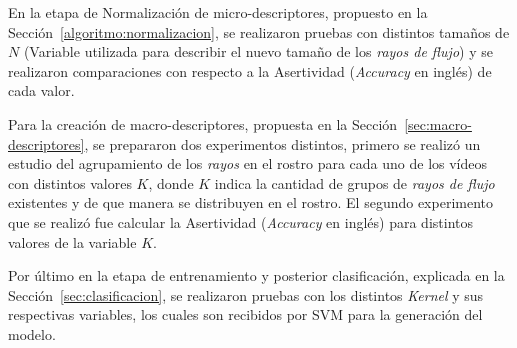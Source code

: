 En la etapa de Normalización de micro-descriptores, propuesto en la Sección~\ref{algoritmo:normalizacion}, se realizaron pruebas con distintos tamaños de $N$ (Variable utilizada para describir el nuevo tamaño de los \textit{rayos de flujo}) y se realizaron comparaciones con respecto a la Asertividad (\textit{Accuracy} en inglés) de cada valor.

Para la creación de macro-descriptores, propuesta en la Sección~\ref{sec:macro-descriptores}, se prepararon dos experimentos distintos, primero se realizó un estudio del agrupamiento de los \textit{rayos} en el rostro para cada uno de los vídeos con distintos valores $K$, donde $K$ indica la cantidad de grupos de \textit{rayos de flujo} existentes y de que manera se distribuyen en el rostro. El segundo experimento que se realizó fue calcular la Asertividad (\textit{Accuracy} en inglés) para distintos valores de la variable $K$.

Por último en la etapa de entrenamiento y posterior clasificación, explicada en la Sección~\ref{sec:clasificacion}, se realizaron pruebas con los distintos \textit{Kernel} y sus respectivas variables, los cuales son recibidos por SVM para la generación del modelo.


